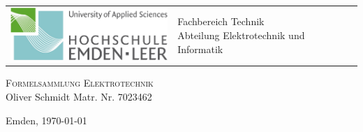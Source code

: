 \begin{titlepage}

\hspace{-1.0cm}
\begin{tabular}{p{8.0cm} p{8.0cm}}
  \includegraphics[width = 6.0cm]{img/Technik.png} &
   \parbox[b]{8.0cm}{
     {\large 	Fachbereich Technik }\\
     {\large 	Abteilung Elektrotechnik und Informatik }     
    } \\
   \\
   \hline
\end{tabular}
%
\begin{center}

\vspace{2.5cm}
\LARGE{\textsc{Formelsammlung Elektrotechnik}}\\

\vspace{2cm}%
\large
Oliver Schmidt\hspace{2cm} Matr. Nr. 7023462

\vspace{1cm} 
Emden, \today


\end{center}
\normalsize
\end{titlepage}
